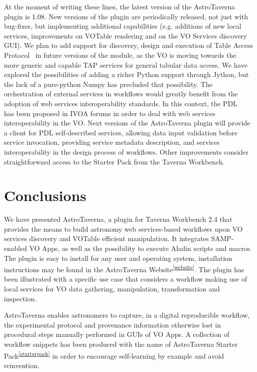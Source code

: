 \documentclass{aa}
\begin{document}
At the moment of writing these lines, the latest version of the AstroTaverna plugin is 1.08. New versions of the plugin are periodically released, not just with bug-fixes, but implementing additional capabilities (e.g. additions of new local services, improvements on VOTable rendering and on the VO Services discovery GUI). We plan to add support for discovery, design and execution of Table Access Protocol~\citep[TAP;][]{Dowler2010} in future versions of the module, as the VO is moving towards the more generic and capable TAP services for general tabular data access. We have explored the possibilities of adding a richer Python support through Jython, but the lack of a pure-python Numpy has precluded that possibility. The orchestration of external services in workflows would greatly benefit from the adoption of web services interoperability standards. In this context, the PDL~\citep[Parameter Description Language;][]{Zwolf2013} has been proposed in IVOA forums in order to deal with web services interoperability in the VO. Next versions of the AstroTaverna plugin will provide a client for PDL self-described services, allowing data input validation before service invocation, providing service metadata description, and services interoperability in the design process of workflows. Other improvements consider  straightforward access to the Starter Pack from the Taverna Workbench. 

\section{Conclusions}
\label{Conclusions}

We have presented AstroTaverna, a plugin for Taverna Workbench 2.4 that provides the means to build astronomy web services-based workflows upon VO services discovery and VOTable efficient manipulation. It integrates SAMP-enabled VO Apps, as well as the possibility to execute Aladin scripts and macros. The plugin is easy to install for any user and operating system, installation instructions may be found in the
AstroTaverna Website\textsuperscript{\ref{website}}. The plugin has been illustrated with a specific use case that considers a workflow making use of local services for VO data gathering, manipulation, transformation and inspection.

AstroTaverna  enables astronomers to capture, in a digital reproducible workflow, the experimental protocol and provenance information otherwise lost in procedural steps manually performed in GUIs of VO Apps. A collection of workflow snippets has been produced with the name of AstroTaverna Starter Pack\textsuperscript{\ref{starterpack}} in order to encourage self-learning by example and avoid reinvention.
\end{document}
